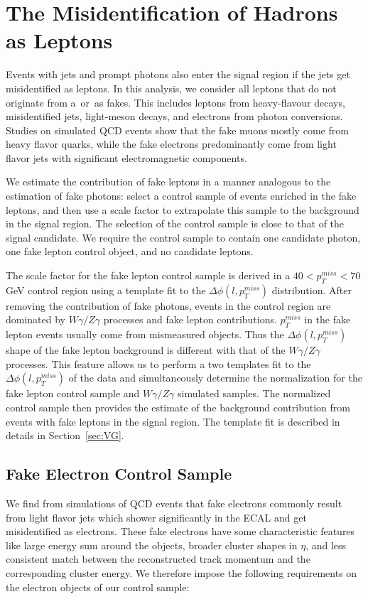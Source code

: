 \documentclass[thesis.tex]{subfiles}
\renewcommand\_{\textunderscore\allowbreak}
\begin{document}
\section{The Misidentification of Hadrons as Leptons}
\label{sec:jetfakelep}

Events with jets and prompt photons also enter the signal region if the jets get misidentified as leptons. In this analysis,  we consider all leptons that do not originate  from a~\PWpm or~\PZz as  fakes. This includes leptons from heavy-flavour decays, misidentified jets, light-meson decays, and electrons from photon conversions. Studies on simulated QCD events show that the fake muons mostly come from  heavy flavor quarks, while the fake electrons predominantly come from light flavor jets with significant electromagnetic components. 

We estimate the contribution of fake leptons in a manner analogous to the
estimation of fake photons: select a control sample of events enriched in the fake leptons, and then use a scale factor to extrapolate this sample to the background in the signal region.  The selection of the control sample is close to that of the signal candidate. We require the control sample to contain one candidate photon, one fake lepton control object, and no candidate leptons. 

The scale factor for the fake lepton control sample is derived in a $40 < p_{T}^{miss} < 70$ GeV control region using a template fit to the
$\Delta\phi\left(l, p_{T}^{miss}\right)$ distribution. After removing the contribution of fake photons, events in the control region are dominated by $W\gamma/Z\gamma$ processes and fake lepton contributions. $p_{T}^{miss}$ in the fake lepton events usually come from mismeasured objects. Thus the $\Delta\phi\left(l, p_{T}^{miss}\right)$ shape of the fake lepton background is different with that of the $W\gamma/Z\gamma$ processes. This feature allows us to perform a two templates fit to the $\Delta\phi\left(l, p_{T}^{miss}\right)$ of the data and simultaneously determine the normalization for the fake lepton control sample and $W\gamma/Z\gamma$ simulated samples. The normalized control sample then provides the estimate of the
background contribution from events with fake leptons in the signal region. The template fit is described in details in Section~\ref{sec:VG}. 

\subsection{Fake Electron Control Sample}
We find from simulations of QCD events that fake electrons commonly result from light flavor jets which shower significantly in the ECAL and get misidentified as electrons. These fake electrons have some characteristic features like large energy sum around the objects,  broader cluster shapes in $\eta$, and less consistent match between the reconstructed track momentum and the corresponding cluster energy. We therefore impose the following requirements on the electron objects of our control sample:
\end{document}
